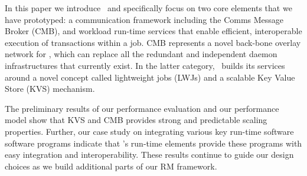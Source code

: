 In this paper we introduce \flux\ and specifically focus on two core 
elements that we have prototyped: a
communication framework including the Comms Message Broker (CMB), and
workload run-time services that enable efficient, interoperable 
execution of transactions within a job. 
CMB represents a novel back-bone overlay network
for \flux,
which can replace all the redundant and independent 
daemon infrastructures that currently exist.  
In the latter category, \flux\ builds its services
around a novel concept called lightweight jobs (LWJs)
and a scalable Key Value Store (KVS) mechanism.

The preliminary results of our performance evaluation 
and our  performance model show that KVS and CMB provides 
strong and predictable scaling properties.
Further, our case study on integrating various key run-time software software
programs indicate that \flux's run-time elements 
provide these programs with 
easy integration and interoperability.
These results continue to guide our design choices
as we build additional parts of our RM framework.


